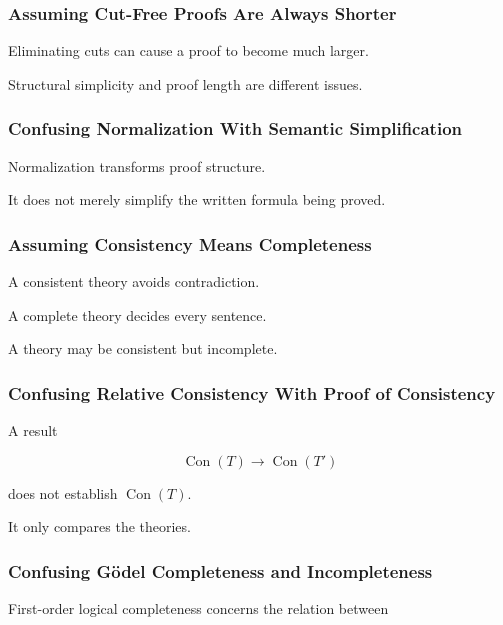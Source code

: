 \subsubsection{Assuming Cut-Free Proofs Are Always Shorter}

Eliminating cuts can cause a proof to become much larger.

Structural simplicity and proof length are different issues.

\subsubsection{Confusing Normalization With Semantic Simplification}

Normalization transforms proof structure.

It does not merely simplify the written formula being proved.

\subsubsection{Assuming Consistency Means Completeness}

A consistent theory avoids contradiction.

A complete theory decides every sentence.

A theory may be consistent but incomplete.

\subsubsection{Confusing Relative Consistency With Proof of Consistency}

A result

\[
\operatorname{Con}(T)
\rightarrow
\operatorname{Con}(T')
\]

does not establish \(\operatorname{Con}(T)\).

It only compares the theories.

\subsubsection{Confusing Gödel Completeness and Incompleteness}

First-order logical completeness concerns the relation between

